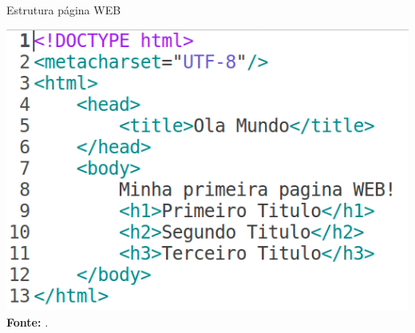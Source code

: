 \documentclass{beamer}
\begin{document}
\begin{frame}{Estrutura página WEB}
		\begin{center}
\includegraphics[height=0.65\paperheight]{fig/aula2/html1.png} \\     		
\tiny \textbf{Fonte:} \cite{wschool2021html}.
		\end{center}
\end{frame}
\end{document}
